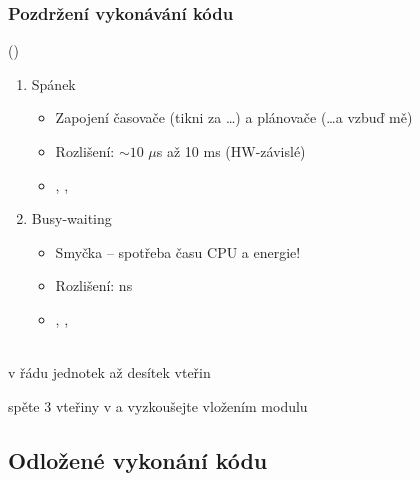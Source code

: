 \begin{frame}
  \frametitle{Pozdržení vykonávání kódu}

   ()
  \begin{enumerate}
    \item Spánek
    \begin{itemize}
      \item Zapojení časovače (tikni za \dots) a plánovače (\dots a vzbuď mě)
      \item Rozlišení: $\sim 10\,\,\mu$s až 10 ms (HW-závislé)
      \item {}, , 
    \end{itemize}

    \pause

    \item Busy-waiting
    \begin{itemize}
      \item Smyčka -- spotřeba času CPU a energie!
      \item Rozlišení: ns
      \item {}, , 
    \end{itemize}
  \end{enumerate}

  \pause
  \medskip

  \begin{center}
   \\
  v řádu jednotek až desítek vteřin
  \end{center}

  \iffimuni
  \pause
  \medskip

   spěte 3 vteřiny v  a vyzkoušejte vložením
    modulu
  \fi

\end{frame}

\iffimuni
\subsection{Odložené vykonání kódu}
\fi

